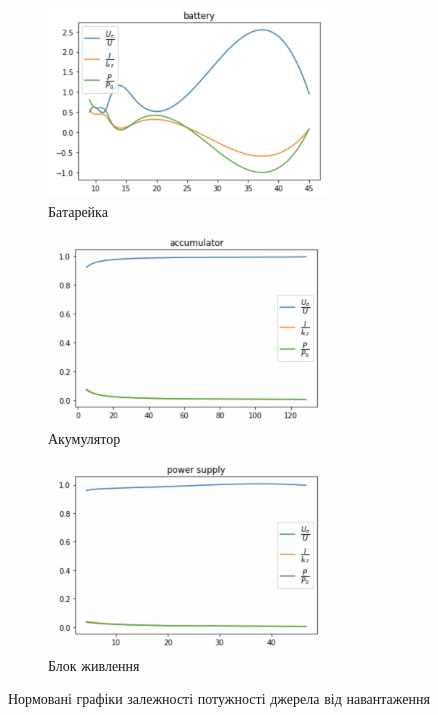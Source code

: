 \documentclass[a4paper,12pt]{article}
\begin{document}
\begin{justify}
\begin{figure}[!h]
		\label{fig:7}
	\end{figure}\newpage
	 \begin{figure}[!h]
		\centering
		\begin{subfigure}{0.4\linewidth}
			\includegraphics[height=50mm]{media/graph8aaa.png}
    		\caption{Батарейка}
			\label{fig:8a}
    	\end{subfigure}\hfill
    	\begin{subfigure}{0.4\linewidth}
			\includegraphics[height=50mm]{media/graph8bbb.png}
    		\caption{Акумулятор}
			\label{fig:8b}
    	\end{subfigure}\hfill
    	\begin{subfigure}{0.4\linewidth}
			\includegraphics[height=50mm]{media/graph8ccc.png}
    		\caption{Блок живлення}
			\label{fig:8c}
    	\end{subfigure}\hfill
		\caption{Нормовані графіки залежності потужності джерела від навантаження}
		\label{fig:8}
	\end{figure}

\end{justify}
\end{document}

